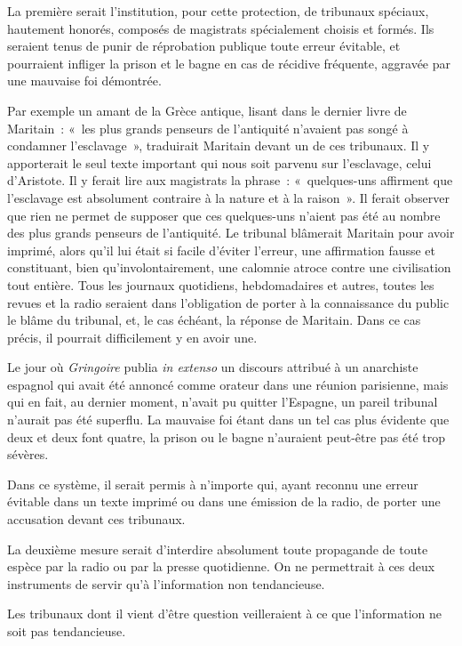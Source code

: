 \documentclass[french,twoside]{book} %
\begin{document}
La première serait l'institution, pour cette protection, de tribunaux spéciaux, hautement honorés, composés de magistrats spécialement choisis et formés. Ils seraient tenus de punir de réprobation publique toute erreur évitable, et pourraient infliger la prison et le bagne en cas de récidive fréquente, aggravée par une mauvaise foi démontrée.\par
Par exemple un amant de la Grèce antique, lisant dans le dernier livre de Maritain : « les plus grands penseurs de l'antiquité n'avaient pas songé à condamner l'esclavage », traduirait Maritain devant un de ces tribunaux. Il y apporterait le seul texte important qui nous soit parvenu sur l'esclavage, celui d'Aristote. Il y ferait lire aux magistrats la phrase : « quelques-uns affirment que l'esclavage est absolument contraire à la nature et à la raison ». Il ferait observer que rien ne permet de supposer que ces quelques-uns n'aient pas été au nombre des plus grands penseurs de l'antiquité. Le tribunal blâmerait Maritain pour avoir imprimé, alors qu'il lui était si facile d'éviter l'erreur, une affirmation fausse et constituant, bien qu'involontairement, une calomnie atroce contre une civilisation tout entière. Tous les journaux quotidiens, hebdomadaires et autres, toutes les revues et la radio seraient dans l'obligation de porter à la connaissance du public le blâme du tribunal, et, le cas échéant, la réponse de Maritain. Dans ce cas précis, il pourrait difficilement y en avoir une.\par
Le jour où {\itshape Gringoire} publia {\itshape in extenso} un discours attribué à un anarchiste espagnol qui avait été annoncé comme orateur dans une réunion parisienne, mais qui en fait, au dernier moment, n'avait pu quitter l'Espagne, un pareil tribunal n'aurait pas été superflu. La mauvaise foi étant dans un tel cas plus évidente que deux et deux font quatre, la prison ou le bagne n'auraient peut-être pas été trop sévères.\par
Dans ce système, il serait permis à n'importe qui, ayant reconnu une erreur évitable dans un texte imprimé ou dans une émission de la radio, de porter une accusation devant ces tribunaux.\par
La deuxième mesure serait d'interdire absolument toute propagande de toute espèce par la radio ou par la presse quotidienne. On ne permettrait à ces deux instruments de servir qu'à l'information non tendancieuse.\par
Les tribunaux dont il vient d'être question veilleraient à ce que l'information ne soit pas tendancieuse.\par
\end{document}
